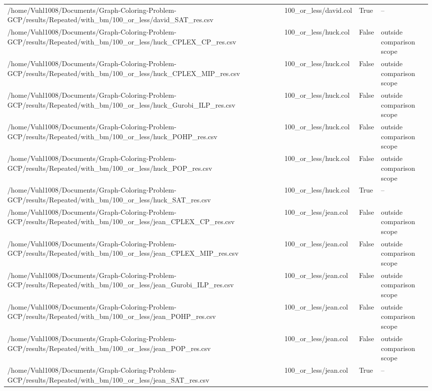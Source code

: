 \begin{table}[htbp]
\begin{tabular}{llll}
/home/Vuhl1008/Documents/Graph-Coloring-Problem-GCP/results/Repeated/with\_bm/100\_or\_less/david\_SAT\_res.csv & 100\_or\_less/david.col & True & -- \\
/home/Vuhl1008/Documents/Graph-Coloring-Problem-GCP/results/Repeated/with\_bm/100\_or\_less/huck\_CPLEX\_CP\_res.csv & 100\_or\_less/huck.col & False & outside comparison scope \\
/home/Vuhl1008/Documents/Graph-Coloring-Problem-GCP/results/Repeated/with\_bm/100\_or\_less/huck\_CPLEX\_MIP\_res.csv & 100\_or\_less/huck.col & False & outside comparison scope \\
/home/Vuhl1008/Documents/Graph-Coloring-Problem-GCP/results/Repeated/with\_bm/100\_or\_less/huck\_Gurobi\_ILP\_res.csv & 100\_or\_less/huck.col & False & outside comparison scope \\
/home/Vuhl1008/Documents/Graph-Coloring-Problem-GCP/results/Repeated/with\_bm/100\_or\_less/huck\_POHP\_res.csv & 100\_or\_less/huck.col & False & outside comparison scope \\
/home/Vuhl1008/Documents/Graph-Coloring-Problem-GCP/results/Repeated/with\_bm/100\_or\_less/huck\_POP\_res.csv & 100\_or\_less/huck.col & False & outside comparison scope \\
/home/Vuhl1008/Documents/Graph-Coloring-Problem-GCP/results/Repeated/with\_bm/100\_or\_less/huck\_SAT\_res.csv & 100\_or\_less/huck.col & True & -- \\
/home/Vuhl1008/Documents/Graph-Coloring-Problem-GCP/results/Repeated/with\_bm/100\_or\_less/jean\_CPLEX\_CP\_res.csv & 100\_or\_less/jean.col & False & outside comparison scope \\
/home/Vuhl1008/Documents/Graph-Coloring-Problem-GCP/results/Repeated/with\_bm/100\_or\_less/jean\_CPLEX\_MIP\_res.csv & 100\_or\_less/jean.col & False & outside comparison scope \\
/home/Vuhl1008/Documents/Graph-Coloring-Problem-GCP/results/Repeated/with\_bm/100\_or\_less/jean\_Gurobi\_ILP\_res.csv & 100\_or\_less/jean.col & False & outside comparison scope \\
/home/Vuhl1008/Documents/Graph-Coloring-Problem-GCP/results/Repeated/with\_bm/100\_or\_less/jean\_POHP\_res.csv & 100\_or\_less/jean.col & False & outside comparison scope \\
/home/Vuhl1008/Documents/Graph-Coloring-Problem-GCP/results/Repeated/with\_bm/100\_or\_less/jean\_POP\_res.csv & 100\_or\_less/jean.col & False & outside comparison scope \\
/home/Vuhl1008/Documents/Graph-Coloring-Problem-GCP/results/Repeated/with\_bm/100\_or\_less/jean\_SAT\_res.csv & 100\_or\_less/jean.col & True & -- \\

\end{tabular}
\end{table}
